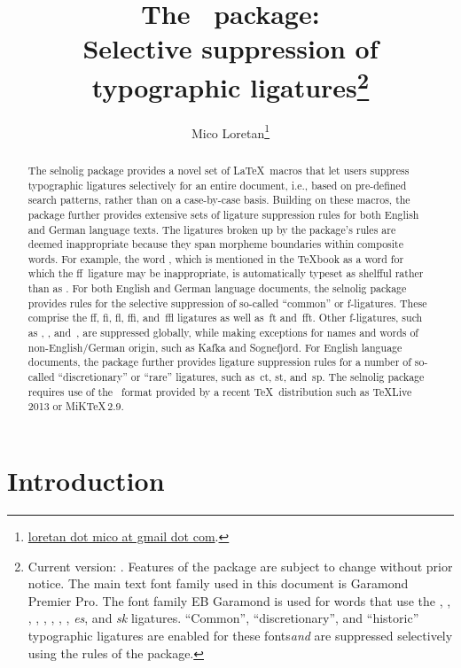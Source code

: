 \documentclass[11pt]{article}
\title{The \selnoligpackagename\ package: \\
Selective suppression of typographic ligatures\thanks{ 
Current version: \selnoligpackageversion. Features of the \pkg{selnolig} package are subject to change without prior notice. 
\newline\hspace*{\parindent}
The main text font family used in this document is Garamond Premier Pro. The font family {\ebg EB Garamond} is used for words that use the {\ebg \uselig{fb}, \uselig{fh}, \uselig{fj}, \uselig{fk}, \uselig{ffb}, \uselig{ffh}, \uselig{ffj}, \uselig{ffk}, \emph{es}}, and {\ebg\emph{sk}} ligatures. \enquote{Common}, \enquote{discretionary}, and \enquote{historic} typographic ligatures are enabled for these  fonts\textemdash \emph{and} are suppressed selectively using the rules of the \pkg{selnolig} package.} }
\author{Mico Loretan\thanks{
\href{mailto:loretan.mico@gmail.com}{loretan dot mico at gmail dot com}.}}
\date{\selnoligpackagedate}
\newcommand{\pkg}[1]{\textsf{#1}}
\newcommand{\opt}[1]{\uselig{\texttt{#1}}}
\begin{document}
\VerbatimFootnotes
{}

\maketitle


\begin{abstract}

The \pkg{selnolig} package provides a novel set of \LaTeX\ macros that let users suppress typographic ligatures selectively for an entire document, i.e., based on pre-defined search patterns, rather than on a case-by-case basis. Building on these macros, the package further provides extensive sets of ligature suppression rules for both English and German language texts. The ligatures broken up by the package's rules are deemed inappropriate because they span morpheme boundaries within composite words. For example, the word \opt{shelfful}, which is mentioned in the \TeX book as a word for which the ff~ligature may be inappropriate, is automatically typeset as shelfful rather than as .
\newline\hspace*{\parindent}
For both English and German language documents, the \pkg{selnolig} package provides rules for the selective suppression of so-called \enquote{common} or f-ligatures. These comprise the ff, fi, fl, ffi, and~ffl ligatures as well as~ft and~fft. Other f-ligatures, such as {\ebg{}}, {\ebg{}}, {\ebg{}} and~{\ebg{}}, are suppressed globally, while making exceptions for names and words of non-English/German origin, such as {\ebg Kafka} and {\ebg Sognefjord}.
\newline\hspace*{\parindent}
For English language documents, the package further provides ligature suppression rules for a number of so-called \enquote{discretionary} or \enquote{rare} ligatures, such as~ct, st, and~sp.
\newline\hspace*{\parindent}
The \pkg{selnolig} package requires use of the \LuaLaTeX\ format provided by a recent \TeX\ distribution such as \TeX Live\,2013 or MiK\TeX\,2.9.
\end{abstract}

\tableofcontents

\clearpage
{}


\section{Introduction}
\end{document}
